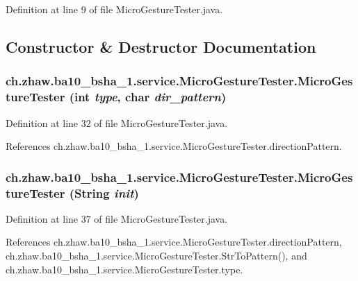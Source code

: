 Definition at line 9 of file MicroGestureTester.java.

\subsection{Constructor \& Destructor Documentation}
\hypertarget{classch_1_1zhaw_1_1ba10__bsha__1_1_1service_1_1MicroGestureTester_a168b10f8692c3b78d909d2bbcf953cae}{
\subsubsection[{MicroGestureTester}]{\setlength{\rightskip}{0pt plus 5cm}ch.zhaw.ba10\_\-bsha\_\-1.service.MicroGestureTester.MicroGestureTester (int {\em type}, \/  char {\em dir\_\-pattern})}}
\label{classch_1_1zhaw_1_1ba10__bsha__1_1_1service_1_1MicroGestureTester_a168b10f8692c3b78d909d2bbcf953cae}


Definition at line 32 of file MicroGestureTester.java.

References ch.zhaw.ba10\_\-bsha\_\-1.service.MicroGestureTester.directionPattern.\hypertarget{classch_1_1zhaw_1_1ba10__bsha__1_1_1service_1_1MicroGestureTester_ac8c8bca517c9612baa7c7b4913c8070a}{
\subsubsection[{MicroGestureTester}]{\setlength{\rightskip}{0pt plus 5cm}ch.zhaw.ba10\_\-bsha\_\-1.service.MicroGestureTester.MicroGestureTester (String {\em init})}}
\label{classch_1_1zhaw_1_1ba10__bsha__1_1_1service_1_1MicroGestureTester_ac8c8bca517c9612baa7c7b4913c8070a}


Definition at line 37 of file MicroGestureTester.java.

References ch.zhaw.ba10\_\-bsha\_\-1.service.MicroGestureTester.directionPattern, ch.zhaw.ba10\_\-bsha\_\-1.service.MicroGestureTester.StrToPattern(), and ch.zhaw.ba10\_\-bsha\_\-1.service.MicroGestureTester.type.

